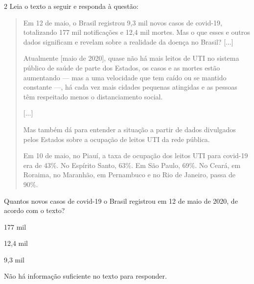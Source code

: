 \num{2} Leia o texto a seguir e responda à questão:

\begin{quote}
Em 12 de maio, o Brasil registrou 9,3 mil novos casos de covid-19,
totalizando 177 mil notificações e 12,4 mil mortes. Mas o que esses e
outros dados significam e revelam sobre a realidade da doença no Brasil?
{[}...{]}

Atualmente {[}maio de 2020{]}, quase não há mais leitos de UTI no
sistema público de saúde de parte dos Estados, os casos e as mortes
estão aumentando --- mas a uma velocidade que tem caído ou se mantido
constante ---, há cada vez mais cidades pequenas atingidas e as pessoas
têm respeitado menos o distanciamento social.

{[}...{]}

Mas também dá para entender a situação a partir de dados divulgados
pelos Estados sobre a ocupação de leitos UTI da rede pública.

Em 10 de maio, no Piauí, a taxa de ocupação dos leitos UTI para covid-19
era de 43\%. No Espírito Santo, 63\%. Em São Paulo, 69\%. No Ceará, em
Roraima, no Maranhão, em Pernambuco e no Rio de Janeiro, passa de 90\%.


\end{quote}

Quantos novos casos de covid-19 o Brasil registrou em 12 de maio de 2020, de acordo com o texto?

\begin{escolha}
\item 177 mil

\item 12,4 mil

\item 9,3 mil

\item Não há informação suficiente no texto para responder.
\end{escolha}


